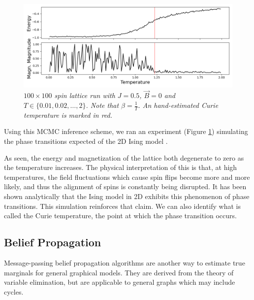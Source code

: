 \documentclass{article}
\begin{document}
\begin{figure}
    \includegraphics[width=\textwidth]{report_mcmc_phase}
    \caption{\textit{
        $100 \times 100$ spin lattice run with $J=0.5$, $\vec{B} = 0$ and 
        $T \in \{0.01, 0.02, \dots, 2\}$. 
        Note that $\beta = \frac{1}{T}$. 
        An hand-estimated Curie temperature is marked in red. 
    }}
    \label{fig:mcmc_phase}
\end{figure}

Using this MCMC inference scheme, we ran an experiment (Figure 
\ref{fig:mcmc_phase}) simulating the phase transitions expected of the 2D 
Ising model \cite{peirerls1936}. 

As seen, the energy and magnetization of the lattice both degenerate to zero 
as the temperature increases. 
The physical interpretation of this is that, at high temperatures, the field 
fluctuations which cause spin flips become more and more likely, and thus 
the alignment of spins is constantly being disrupted. 
It has been shown analytically that the Ising model in 2D exhibits this 
phenomenon of phase transitions. 
This simulation reinforces that claim. 
We can also identify what is called the Curie temperature, the point at which 
the phase transition occurs. 
%
%
%
%
%
\subsection{Belief Propagation}
%
%
%
%
%
Message-passing belief propagation algorithms are another way to estimate true 
marginals for general graphical models. 
They are derived from the theory of variable elimination, but are applicable to 
general graphs which may include cycles. 
\end{document}
